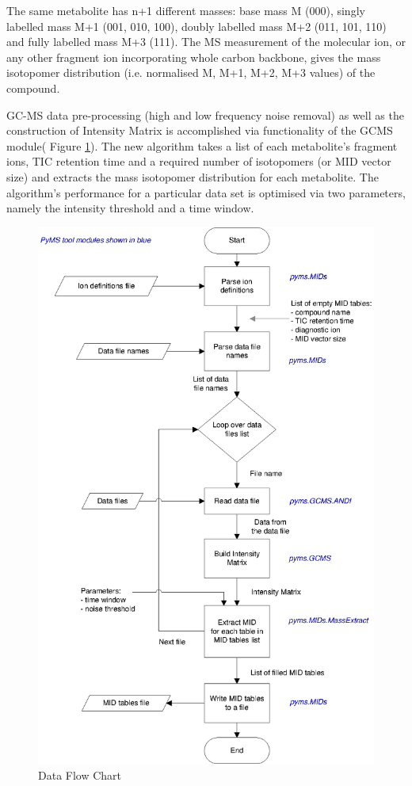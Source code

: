The same metabolite has n+1 different masses: base mass M (000), singly labelled
mass M+1 (001, 010, 100), doubly labelled mass M+2 (011, 101, 110) and fully 
labelled mass M+3 (111). The MS measurement of the molecular ion, or any other 
fragment ion incorporating whole carbon backbone,  gives the mass isotopomer 
distribution (i.e. normalised M, M+1, M+2, M+3 values) of the compound.

GC-MS data pre-processing (high and low frequency noise removal) as well as the 
construction of Intensity Matrix is accomplished via functionality of the GCMS 
module( Figure \ref{fig:81}). The new algorithm takes a list of each 
metabolite’s fragment ions, TIC retention time and a required number of 
isotopomers (or MID vector size) and extracts the mass isotopomer distribution 
for each metabolite. The algorithm’s performance for a particular data set is 
optimised via two parameters, namely the intensity threshold and a time window.

\begin{figure}
  \begin{center}
    \includegraphics[scale=0.7]{graphics/chapter08/81.eps}
  \end{center}
  \caption{Data Flow Chart}
  \label{fig:81}
\end{figure}

